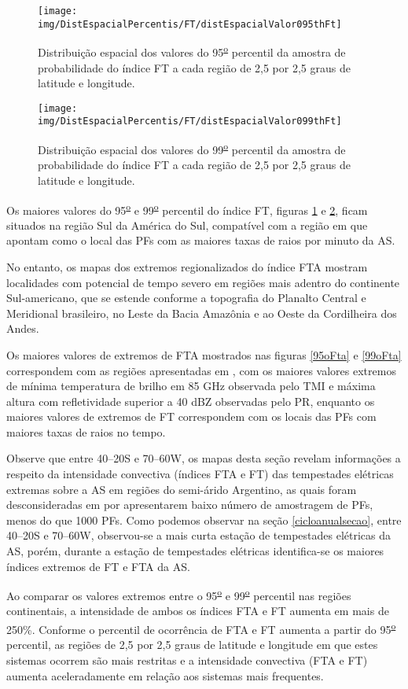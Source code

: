 \begin{figure}[!ht]
\centering
{\texttt{[image: img/DistEspacialPercentis/FT/distEspacialValor095thFt]}} 
\caption{Distribuição espacial dos valores do 95\textsuperscript{\underline{o}} percentil da amostra de probabilidade do índice FT a cada região de 2,5 por 2,5 graus de latitude e longitude.}
\label{95oFt}
\end{figure} 
  
\begin{figure}[!ht]
\centering  
{\texttt{[image: img/DistEspacialPercentis/FT/distEspacialValor099thFt]}}
\caption{Distribuição espacial dos valores do  99\textsuperscript{\underline{o}} percentil da amostra de probabilidade do índice FT a cada região de 2,5 por 2,5 graus de latitude e longitude.}
\label{99oFt}
\end{figure}

Os maiores valores do 95\textsuperscript{\underline{o}} e 99\textsuperscript{\underline{o}} percentil do índice FT, figuras \ref{95oFt} e \ref{99oFt},  ficam situados na região Sul da América do Sul, compatível com a região em que  apontam como o local das PFs com as maiores taxas de raios por minuto da AS.

No entanto, os mapas dos extremos regionalizados do índice FTA mostram localidades com potencial de tempo severo em regiões mais adentro do continente Sul-americano, que se estende conforme a topografia do Planalto Central e Meridional brasileiro, no Leste da Bacia Amazônia e ao Oeste da Cordilheira dos Andes. 

Os maiores valores de extremos de FTA mostrados nas figuras \ref{95oFta} e \ref{99oFta} correspondem com as regiões apresentadas em 
, com os maiores valores extremos de mínima temperatura de brilho em 85 GHz observada pelo TMI e máxima altura com refletividade superior a 40 dBZ observadas pelo PR, enquanto os maiores valores de extremos de FT correspondem com os locais das PFs com maiores taxas de raios no tempo.

Observe que entre 40--20S e 70--60W, os mapas desta seção revelam informações a respeito da intensidade convectiva (índices FTA e FT) das tempestades elétricas extremas sobre a AS em regiões do semi-árido Argentino, as quais foram desconsideradas em  por apresentarem baixo número de amostragem de PFs, menos do que 1000 PFs. Como podemos observar na seção \ref{cicloanualsecao}, entre 40--20S e 70--60W, observou-se a mais curta estação de tempestades elétricas da AS, porém, durante a estação de tempestades elétricas identifica-se os maiores índices extremos de FT e FTA da AS. 

Ao comparar os valores extremos entre o 95\textsuperscript{\underline{o}} e 99\textsuperscript{\underline{o}} percentil nas regiões continentais, a intensidade de ambos os índices FTA e FT aumenta em mais de 250\%. Conforme o percentil de ocorrência de FTA e FT aumenta a partir do 95\textsuperscript{\underline{o}} percentil, as regiões de 2,5 por 2,5 graus de latitude e longitude em que estes sistemas ocorrem são mais restritas e a intensidade convectiva (FTA e FT) aumenta aceleradamente em relação aos sistemas mais frequentes.
